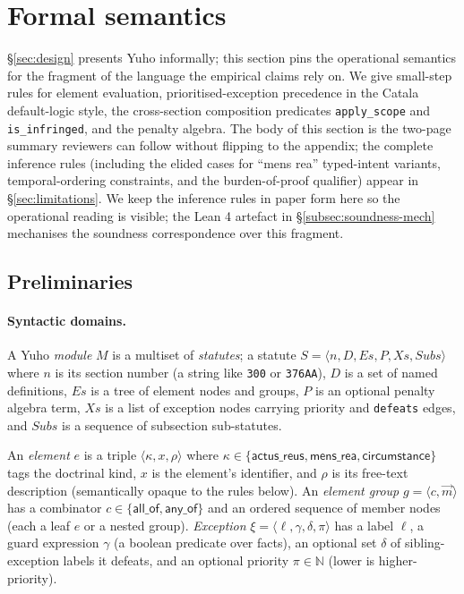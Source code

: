 \section{Formal semantics}
\label{sec:semantics}

\S\ref{sec:design} presents Yuho informally; this section pins the
operational semantics for the fragment of the language the
empirical claims rely on. We give small-step rules for element
evaluation, prioritised-exception precedence in the
Catala~\cite{catala2021} default-logic style, the cross-section
composition predicates \texttt{apply\_scope} and
\texttt{is\_infringed}, and the penalty algebra. The body of this
section is the two-page summary reviewers can follow without
flipping to the appendix; the complete inference rules
(including the elided cases for ``mens rea'' typed-intent
variants, temporal-ordering constraints, and the burden-of-proof
qualifier) appear in \S\ref{sec:limitations}. We keep the
inference rules in paper form here so the operational reading is
visible; the Lean 4 artefact in \S\ref{subsec:soundness-mech}
mechanises the soundness correspondence over this fragment.

\subsection{Preliminaries}
\label{subsec:semantics-prelim}

\paragraph{Syntactic domains.} A Yuho \emph{module} $M$ is a
multiset of \emph{statutes}; a statute $S = \langle n, D,
\mathit{Es}, P, \mathit{Xs}, \mathit{Subs} \rangle$ where $n$ is
its section number (a string like \texttt{300} or
\texttt{376AA}), $D$ is a set of named definitions, $\mathit{Es}$
is a tree of element nodes and groups, $P$ is an optional penalty
algebra term, $\mathit{Xs}$ is a list of exception nodes carrying
priority and \texttt{defeats} edges, and $\mathit{Subs}$ is a
sequence of subsection sub-statutes.

An \emph{element} $e$ is a triple $\langle \kappa, x, \rho
\rangle$ where $\kappa \in \{\textsf{actus\_reus},
\textsf{mens\_rea}, \textsf{circumstance}\}$ tags the doctrinal
kind, $x$ is the element's identifier, and $\rho$ is its
free-text description (semantically opaque to the rules below).
An \emph{element group} $g = \langle c, \vec{m} \rangle$ has a
combinator $c \in \{\textsf{all\_of}, \textsf{any\_of}\}$ and an
ordered sequence of member nodes (each a leaf $e$ or a nested
group). \emph{Exception} $\xi = \langle \ell, \gamma, \delta,
\pi \rangle$ has a label $\ell$, a guard expression $\gamma$
(a boolean predicate over facts), an optional set $\delta$ of
sibling-exception labels it defeats, and an optional priority
$\pi \in \mathbb{N}$ (lower is higher-priority).

